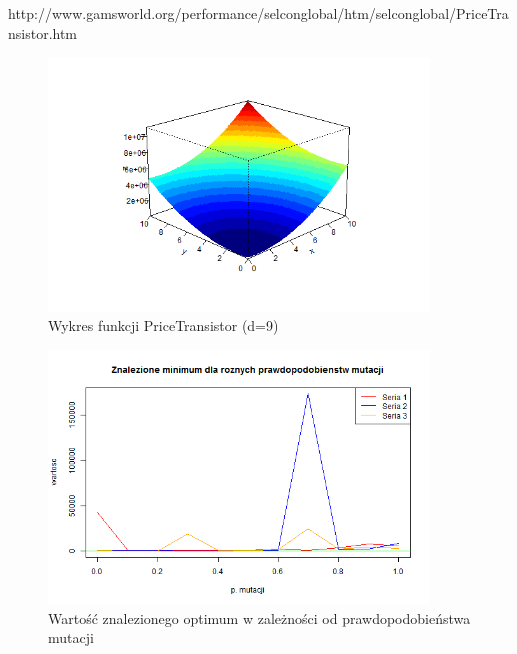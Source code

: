 \documentclass[11pt, a4paper]{article}
\begin{document}
http://www.gamsworld.org/performance/selconglobal/htm/selconglobal/PriceTransistor.htm


\begin{figure}[H]
	\begin{center}
		\includegraphics[width=0.9\textwidth]{./assets/PriceTransistor1.png} %
		\caption{Wykres funkcji PriceTransistor (d=9)}
		\label{fig:pricetransistor1}
	\end{center}
\end{figure}

\begin{figure}[H]
	\begin{center}
		\includegraphics[width=0.9\textwidth]{./assets/PriceTransistor2.png} %
		\caption{Wartość znalezionego optimum w zależności od prawdopodobieństwa mutacji}
		\label{fig:pricetransistor2}
	\end{center}
\end{figure}
\end{document}
